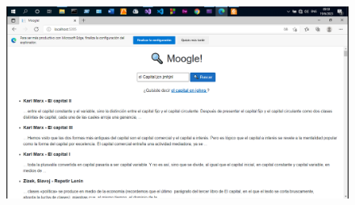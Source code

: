 \documentclass[a4paper,12pt]{report}
\begin{document}
\medskip

\begin{figure}[h]
    \includegraphics*[width=15cm, height=8cm]{fotos/16 - Resultados (9).png}
\end{figure}
\end{document}
